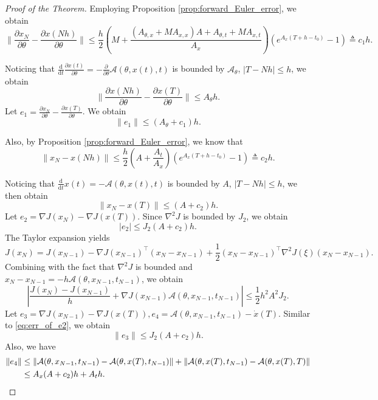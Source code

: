 \documentclass{article}
\newcommand{\Acal}{\mathcal{A}}
\newcommand{\dd}{\mathrm{d}}
\begin{document}
\begin{proof}[Proof of the Theorem]
    Employing Proposition \ref{prop:forward_Euler_error}, we obtain
    \begin{equation}
    \label{eq:def_c1}\|\frac{\partial x_N}{\partial \theta}-\frac{\partial x(Nh)}{\partial \theta}\|\leq
    \frac{h}2(M+\frac{(A_{\theta,x}+MA_{x,x})A+A_{\theta,t}+MA_{x,t}}{A_x})(e^{A_x(T+h-t_0)}-1)\triangleq c_1h.
    \end{equation}

    Noticing that $\frac{\dd}{\dd t}\frac{\partial x(t)}{\partial \theta} = -\frac{\partial}{\partial\theta}\Acal(\theta,x(t),t)$ is bounded by $\Acal_{\theta}$, $|T-Nh|\leq h$, we obtain 
    \[
    \|\frac{\partial x(Nh)}{\partial\theta}-\frac{\partial x(T)}{\partial\theta}\|\leq A_{\theta}h.
    \]
    Let $e_1 = \frac{\partial x_N}{\partial \theta}-\frac{\partial x(T)}{\partial\theta}$. We obtain
    \begin{equation}\label{eq:err_of_e1}
        \|e_1\|\leq (A_{\theta}+c_1)h.
    \end{equation}

    Also, by Proposition \ref{prop:forward_Euler_error}, we know that \begin{equation}\label{eq:def_c2}
        \|x_N-x(Nh)\|\leq\frac{h}{2}(A+\frac{A_t}{A_x})(e^{A_x(T+h-t_0)}-1)\triangleq c_2h.
    \end{equation} 
    
    Noticing that $\frac{\dd}{\dd  t}x(t)=-\Acal(\theta,x(t),t)$ is bounded by $A$, $|T-Nh|\leq h$, we then obtain 
    \[\|x_N-x(T)\|\leq(A+c_2)h.\]
    Let $e_2 = \nabla J(x_N)-\nabla J(x(T))$. Since $\nabla^2 J$ is bounded by $J_2$, we obtain 
    \begin{equation}\label{eq:err_of_e2}
        |e_2| \leq J_2(A+c_2)h. 
    \end{equation}
    The Taylor expansion yields
    \[
    J(x_N) = J(x_{N-1}) - \nabla J(x_{N-1})^\top(x_N-x_{N-1})+\frac{1}2(x_N-x_{N-1})^\top\nabla^2J(\xi)(x_N-x_{N-1}).
    \]
    Combining with the fact that $\nabla^2J$ is bounded and $x_N-x_{N-1} = -h\Acal(\theta,x_{N-1},t_{N-1})$, we obtain
    \[|\frac{J(x_N)-J(x_{N-1})}h + \nabla J(x_{N-1})\Acal(\theta,x_{N-1},t_{N-1})|\leq\frac12h^2A^2J_2.\]
    Let $e_3 = \nabla J(x_{N-1})-\nabla J(x(T)),e_4=\Acal(\theta,x_{N-1},t_{N-1})-\dot{x}(T)$. Similar to \ref{eq:err_of_e2}, we obtain
    \begin{equation}\label{eq:err_of_e3}
        \|e_3\|\leq J_2(A+c_2)h. 
    \end{equation}
    Also, we have 
    \begin{align}
        \label{eq:err_of_e4}
        \|e_4\|&\leq
        \|\Acal(\theta,x_{N-1},t_{N-1})-\Acal(\theta,x(T),t_{N-1})\| + 
        \|\Acal(\theta,x(T),t_{N-1})-
        \Acal(\theta,x(T),T)\|\notag\\
        &\leq A_x(A+c_2)h+A_th.
    \end{align}


\end{proof}
\end{document}
